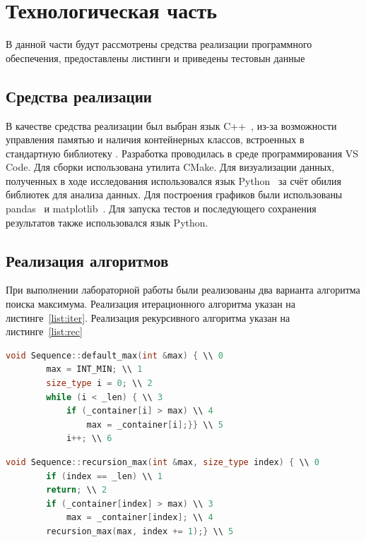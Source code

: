 \chapter{Технологическая часть}
В данной части будут рассмотрены средства реализации программного обеспечения, предоставлены листинги и приведены тестовын данные

\section{Средства реализации}
В качестве средства реализации был выбран язык C++~\cite{lit5}, из-за возможности управления памятью и наличия контейнерных классов, встроенных в стандартную библиотеку . Разработка проводилась в среде программирования VS Code. Для сборки использована утилита CMake. Для визуализации данных, полученных в ходе исследования использовался язык Python~\cite{lit6} за счёт обилия библиотек для анализа данных. Для построения графиков были использованы pandas~\cite{lit7} и matplotlib~\cite{lit8}. Для запуска тестов и последующего сохранения результатов также использовался язык Python.

\section{Реализация алгоритмов}
При выполнении лабораторной работы были реализованы два варианта алгоритма поиска максимума. Реализация итерационного алгоритма указан на листинге~\ref{list:iter}. Реализация рекурсивного алгоритма указан на листинге~\ref{list:rec}
\begin{lstlisting}[language=C++, caption={Итерационный алгоритм поиска максимума}, captionpos=b, label=list:iter]
	void Sequence::default_max(int &max) { \\ 0
		max = INT_MIN; \\ 1
		size_type i = 0; \\ 2
		while (i < _len) { \\ 3
			if (_container[i] > max) \\ 4
				max = _container[i];}} \\ 5
			i++; \\ 6
\end{lstlisting}

\begin{lstlisting}[language=C++, caption={Рекурсивный алгоритм поиска максимума}, captionpos=b,  label=list:rec]
	void Sequence::recursion_max(int &max, size_type index) { \\ 0
		if (index == _len) \\ 1
		return; \\ 2
		if (_container[index] > max) \\ 3
			max = _container[index]; \\ 4
		recursion_max(max, index += 1);} \\ 5
\end{lstlisting}




